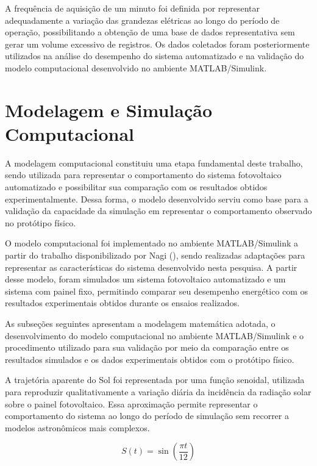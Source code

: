 A frequência de aquisição de um minuto foi definida por representar adequadamente a variação das grandezas elétricas ao longo do período de operação, possibilitando a obtenção de uma base de dados representativa sem gerar um volume excessivo de registros. Os dados coletados foram posteriormente utilizados na análise do desempenho do sistema automatizado e na validação do modelo computacional desenvolvido no ambiente MATLAB/Simulink.

\section{Modelagem e Simulação Computacional}
\label{sec:modelagem_simulacao}

A modelagem computacional constituiu uma etapa fundamental deste trabalho, sendo utilizada para representar o comportamento do sistema fotovoltaico automatizado e possibilitar sua comparação com os resultados obtidos experimentalmente. Dessa forma, o modelo desenvolvido serviu como base para a validação da capacidade da simulação em representar o comportamento observado no protótipo físico.

O modelo computacional foi implementado no ambiente MATLAB/Simulink a partir do trabalho disponibilizado por Nagi (\citeyear{nagi2023}), sendo realizadas adaptações para representar as características do sistema desenvolvido nesta pesquisa. A partir desse modelo, foram simulados um sistema fotovoltaico automatizado e um sistema com painel fixo, permitindo comparar seu desempenho energético com os resultados experimentais obtidos durante os ensaios realizados.

As subseções seguintes apresentam a modelagem matemática adotada, o desenvolvimento do modelo computacional no ambiente MATLAB/Simulink e o procedimento utilizado para sua validação por meio da comparação entre os resultados simulados e os dados experimentais obtidos com o protótipo físico.

A trajetória aparente do Sol foi representada por uma função senoidal, utilizada para reproduzir qualitativamente a variação diária da incidência da radiação solar sobre o painel fotovoltaico. Essa aproximação permite representar o comportamento do sistema ao longo do período de simulação sem recorrer a modelos astronômicos mais complexos.

\begin{equation}
S(t)=\sin\left(\frac{\pi t}{12}\right)
\label{eq:trajetoria}
\end{equation}

